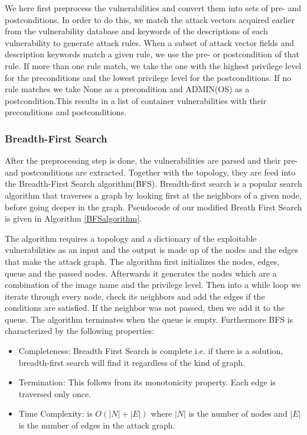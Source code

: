 \documentclass[letterpaper, 10 pt, conference]{ieeeconf}  %
\begin{document}
We here first preprocess the vulnerabilities and convert them into sets of pre- and postconditions. In order to do this, we match the attack vectors acquired earlier from the vulnerability database and keywords of the descriptions of each vulnerability to generate attack rules. When a subset of attack vector fields and description keywords match a given rule, we use the pre- or postcondition of that rule. If more than one rule match, we take the one with the highest privilege level for the preconditions and the lowest privilege level for the postconditions. If no rule matches we take None as a precondition and ADMIN(OS) as a postcondition.This results in a list of container vulnerabilities with their preconditions and postconditions.

\subsubsection{Breadth-First Search}

After the preprocessing step is done, the vulnerabilities are parsed and their pre- and postconditions are extracted. Together with the topology, they are feed into the Breadth-First Search algorithm(BFS).
Breadth-first search is a popular search algorithm that traverses a graph by looking first at the neighbors of a given node, before going deeper in the graph. Pseudocode of our modified Breath First Search is given in Algorithm \ref{BFSalgorithm}. 

The algorithm requires a topology and a dictionary of the exploitable vulnerabilities as an input and the output is made up of the nodes and the edges that make the attack graph. 
The algorithm first initializes the nodes, edges, queue and the passed nodes. Afterwards it generates the nodes which are a combination of the image name and the privilege level.
Then into a while loop we iterate through every node, check its neighbors and add the edges if the conditions are satisfied. If the neighbor was not passed, then we add it to the queue. The algorithm terminates when the queue is empty. Furthermore BFS is characterized by the following properties:

\begin{itemize}
 \item Completeness: Breadth First Search is complete i.e. if there is a solution, breadth-first search will find it regardless of the kind of graph.
 \item Termination: This follows from its monotonicity property. Each edge is traversed only once.
 \item Time Complexity: is $O(|N| + |E|)$ where $|N|$ is the number of nodes and $|E|$ is the number of edges in the attack graph.
\end{itemize}
\end{document}
